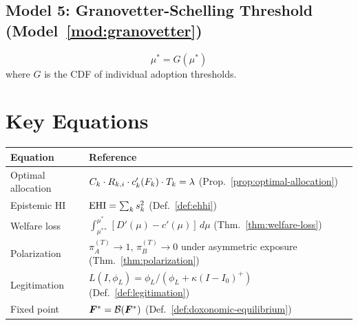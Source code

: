 \subsection*{Model 5: Granovetter-Schelling Threshold (Model~\ref{mod:granovetter})}
\[
  \mu^* = G(\mu^*)
\]
where $G$ is the CDF of individual adoption thresholds.

\section*{Key Equations}

\begin{longtable}{p{4cm} p{9cm}}
\toprule
\textbf{Equation} & \textbf{Reference} \\
\midrule
\endhead
Optimal allocation & $C_{k} \cdot R_{k,i} \cdot c_k'(F_{k}) \cdot T_{k} = \lambda$ (Prop.~\ref{prop:optimal-allocation}) \\
Epistemic HI & $\mathrm{EHI} = \sum_k s_k^2$ (Def.~\ref{def:ehhi}) \\
Welfare loss & $\int_{\mu^{**}}^{\mu^*} [D'(\mu) - c'(\mu)] \, d\mu$ (Thm.~\ref{thm:welfare-loss}) \\
Polarization & $\pi_A^{(T)} \to 1$, $\pi_B^{(T)} \to 0$ under asymmetric exposure (Thm.~\ref{thm:polarization}) \\
Legitimation & $L(I, \phi_L) = \phi_L / (\phi_L + \kappa(I-I_0)^+)$ (Def.~\ref{def:legitimation}) \\
Fixed point & $\bm{F}^* = \mathcal{B}(\bm{F}^*)$ (Def.~\ref{def:doxonomic-equilibrium}) \\
\bottomrule
\end{longtable}
